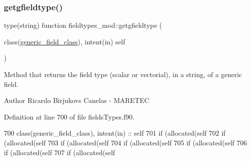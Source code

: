 \mbox{\label{namespacefieldtypes__mod_abd34452f9afd91c4b9eeb60c51908312}} 
\subsubsection{\texorpdfstring{getgfieldtype()}{getgfieldtype()}}
{\footnotesize\ttfamily type(string) function fieldtypes\+\_\+mod\+::getgfieldtype (\begin{DoxyParamCaption}\item[{class(\mbox{\hyperlink{structfieldtypes__mod_1_1generic__field__class}{generic\+\_\+field\+\_\+class}}), intent(in)}]{self }\end{DoxyParamCaption})\hspace{0.3cm}{\ttfamily [private]}}



Method that returns the field type (scalar or vectorial), in a string, of a generic field. 

\begin{DoxyAuthor}{Author}
Ricardo Birjukovs Canelas -\/ M\+A\+R\+E\+T\+EC 
\end{DoxyAuthor}


Definition at line 700 of file fields\+Types.\+f90.


\begin{DoxyCode}
700     \textcolor{keywordtype}{class}(generic\_field\_class), \textcolor{keywordtype}{intent(in)} :: self
701     \textcolor{keywordflow}{if} (\textcolor{keyword}{allocated}(self%
702     \textcolor{keywordflow}{if} (\textcolor{keyword}{allocated}(self%
703     \textcolor{keywordflow}{if} (\textcolor{keyword}{allocated}(self%
704     \textcolor{keywordflow}{if} (\textcolor{keyword}{allocated}(self%
705     \textcolor{keywordflow}{if} (\textcolor{keyword}{allocated}(self%
706     \textcolor{keywordflow}{if} (\textcolor{keyword}{allocated}(self%
707     \textcolor{keywordflow}{if} (\textcolor{keyword}{allocated}(self%
\end{DoxyCode}
\mbox{\label{namespacefieldtypes__mod_a3f1571ad15733a3f2fff43e35f309416}} 
